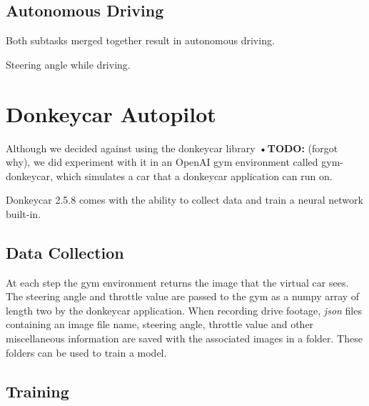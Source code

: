 \documentclass[conference]{IEEEtran}
\begin{document}
\subsection{Autonomous Driving}

Both subtasks merged together result in autonomous driving.

\begin{video}[!t]
	\caption{Steering angle while driving.}
	\label{vid:autodrive}
\end{video}




\section{Donkeycar Autopilot}

Although we decided against using the donkeycar library \textbf{•TODO:} (forgot why), we did experiment with it in an OpenAI gym environment called gym-donkeycar, which simulates a car that a donkeycar application can run on.

Donkeycar 2.5.8 comes with the ability to collect data and train a neural network built-in.

\subsection{Data Collection}

At each step the gym environment returns the image that the virtual car sees. 
The steering angle and throttle value are passed to the gym as a numpy array of length two by the donkeycar application. 
When recording drive footage, \textit{json} files containing an image file name, steering angle, throttle value and other miscellaneous information are saved with the associated images in a folder. 
These folders can be used to train a model.

\subsection{Training}
\end{document}
